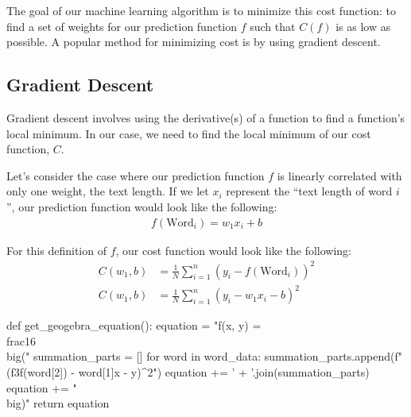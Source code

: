 \documentclass[12pt]{article}
\begin{document}
The goal of our machine learning algorithm is to minimize this cost function: to find a set of weights for our prediction function $f$ such that $C(f)$ is as low as possible. A popular method for minimizing cost is by using gradient descent.

\subsection*{Gradient Descent}

Gradient descent involves using the derivative(s) of a function to find a function's local minimum. In our case, we need to find the local minimum of our cost function, $C$.

Let's consider the case where our prediction function $f$ is linearly correlated with only one weight, the text length. If we let $x_i$ represent the ``text length of word $i$'', our prediction function would look like the following:
\begin{align*}
	f(\text{Word}_i) = w_1x_i + b
\end{align*}

For this definition of $f$, our cost function would look like the following:
\begin{align*}
	C(w_1, b) & = \frac{1}{N} \sum_{i=1}^{n} (y_i - f(\text{Word}_i))^2
	\\
	C(w_1, b) & = \frac{1}{N} \sum_{i=1}^{n} (y_i - w_1x_i - b)^2
\end{align*}

\begin{pycode}
def get_geogebra_equation():
	equation = "f(x, y) = \\frac{1}{6}\\big("
	summation_parts = []
	for word in word_data:
		summation_parts.append(f"({f3f(word[2])} - {word[1]}x - y)^2")
	equation += ' + '.join(summation_parts)
	equation += "\\big)"
	return equation

\end{pycode}
\end{document}
